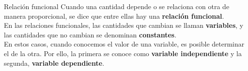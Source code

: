 \begin{infocard}{Relación funcional}
    Cuando una cantidad depende o se relaciona con otra de manera proporcional, se
    dice que entre ellas hay una \textbf{relación funcional}.\\

    En las relaciones funcionales, las
    cantidades que cambian se llaman \textbf{variables}, y las cantidades que no cambian se
    denominan \textbf{constantes}.\\

    En estos casos, cuando conocemos el valor de una variable,
    es posible determinar el de la otra. Por ello, la primera se conoce como \textbf{variable independiente} y la segunda, \textbf{variable dependiente}.
\end{infocard}